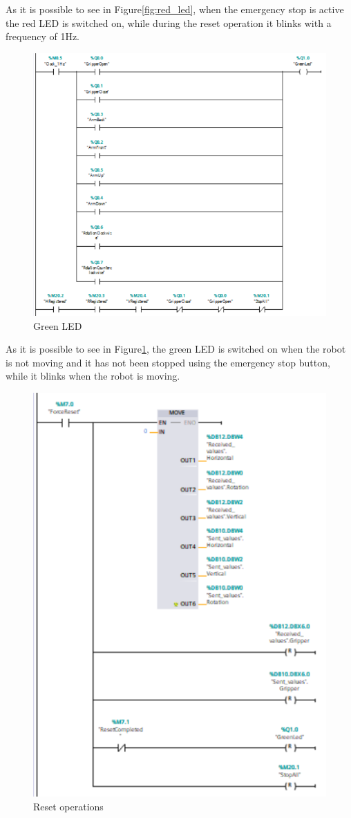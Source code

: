 As it is possible to see in Figure\ref{fig:red_led}, when the emergency stop is active the red LED is switched on, while during the reset operation it blinks with a frequency of 1Hz.

\begin{figure}[!h]
\begin{center}
\includegraphics[width=0.6\linewidth]{capitolo3/figure/green_led.PNG}
\caption{Green LED}
\label{fig:green_led}
\end{center}
\end{figure}

As it is possible to see in Figure\ref{fig:green_led}, the green LED is switched on when the robot is not moving and it has not been stopped using the emergency stop button, while it blinks when the robot is moving.

\begin{figure}[!h]
\begin{center}
\includegraphics[width=0.4\linewidth]{capitolo3/figure/reset_operations.PNG}
\caption{Reset operations}
\label{fig:reset_operations}
\end{center}
\end{figure}

